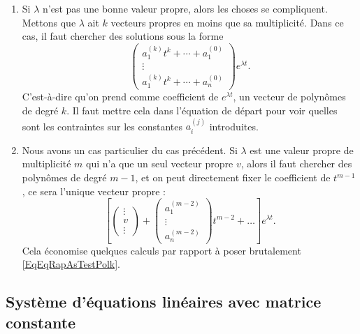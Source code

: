 \begin{enumerate}
	\item
	      Si \( \lambda\) n'est pas une bonne valeur propre, alors les choses se compliquent. Mettons que \( \lambda\) ait \( k\) vecteurs propres en moins que sa multiplicité. Dans ce cas, il faut chercher des solutions sous la forme
	      \begin{equation}		\label{EqEqRapAsTestPolk}
		      \begin{pmatrix}
			      a^{(k)}_1t^k+\cdots+a_1^{(0)} \\
			      \vdots                        \\
			      a^{(k)}_1t^k+\cdots+a_n^{(0)}
		      \end{pmatrix} e^{\lambda t}.
	      \end{equation}
	      C'est-à-dire qu'on prend comme coefficient de \(  e^{\lambda t}\), un vecteur de polynômes de degré \( k\). Il faut mettre cela dans l'équation de départ pour voir quelles sont les contraintes sur les constantes \( a_i^{(j)}\) introduites.

	      \item\label{ItemRapSystDe}
	      Nous avons un cas particulier du cas précédent. Si \( \lambda\) est une valeur propre de multiplicité \( m\) qui n'a que un seul vecteur propre \( v\), alors il faut chercher des polynômes de degré \( m-1\), et on peut directement fixer le coefficient de \( t^{m-1}\), ce sera l'unique vecteur propre :
	      \begin{equation}
		      \left[
		      \begin{pmatrix}
			      \vdots \\
			      v      \\
			      \vdots
		      \end{pmatrix}+
		      \begin{pmatrix}
			      a_1^{(m-2)} \\
			      \vdots      \\
			      a_n^{(m-2)}
		      \end{pmatrix}t^{m-2}+\ldots
		      \right] e^{\lambda t}.
	      \end{equation}
	      Cela économise quelques calculs par rapport à poser brutalement \eqref{EqEqRapAsTestPolk}.

\end{enumerate}
\let\theenumi\oldTheEnumi

\subsection{Système d'équations linéaires avec matrice constante}

